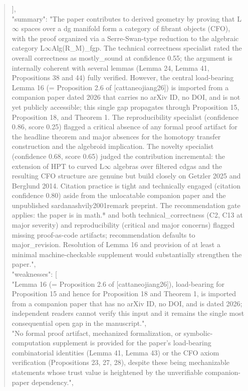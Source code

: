 \documentclass[11pt]{article}
\begin{document}
\begin{quote}
  ],\\
  "summary": "The paper contributes to derived geometry by proving that L\ensuremath{\infty} spaces over a dg manifold form a category of fibrant objects (CFO), with the proof organized via a Serre-Swan-type reduction to the algebraic category L\ensuremath{\infty}Alg(R\_M)\_fgp. The technical correctness specialist rated the overall correctness as mostly\_sound at confidence 0.55; the argument is internally coherent with several lemmas (Lemma 24, Lemma 41, Propositions 38 and 44) fully verified. However, the central load-bearing Lemma 16 (= Proposition 2.6 of [cattaneojiang26]) is imported from a companion paper dated 2026 that carries no arXiv ID, no DOI, and is not yet publicly accessible; this single gap propagates through Proposition 15, Proposition 18, and Theorem 1. The reproducibility specialist (confidence 0.86, score 0.25) flagged a critical absence of any formal proof artifact for the headline theorem and major absences for the homotopy transfer construction and the algebroid implication. The novelty specialist (confidence 0.68, score 0.65) judged the contribution incremental: the extension of HPT to curved L\ensuremath{\infty} algebras over filtered cdgas and the resulting CFO structure are genuine but build closely on Getzler 2025 and Berglund 2014. Citation practice is tight and technically engaged (citation confidence 0.80) aside from the unlocatable companion paper and the unpublished sardanashvily2001remark preprint. The recommendation gate applies: the paper is in math.* and both technical\_correctness (C2, C13 at major severity) and reproducibility (critical and major concerns) flagged missing proof-as-code artifacts; recommendation defaults to major\_revision. Resolution of Lemma 16 and provision of at least a minimal machine-checkable supplement would substantially strengthen the paper.",\\
  "weaknesses": [\\
    "Lemma 16 (= Proposition 2.6 of [cattaneojiang26]), load-bearing for Proposition 15 and hence for Proposition 18 and Theorem 1, is imported from a companion paper that has no arXiv ID, no DOI, and is dated 2026; independent readers cannot verify this input and it remains the single most consequential open gap in the manuscript.",\\
    "No formal proof artifact, mechanized formalization, or symbolic-computation supplement is provided for the paper's load-bearing combinatorial identities (Lemma 41, Lemma 43) or the CFO axiom verification (Propositions 23, 27, 28), despite these being mechanizable statements whose trust value is heightened by the unverifiable companion-paper dependency.",\\

\end{quote}
\end{document}
